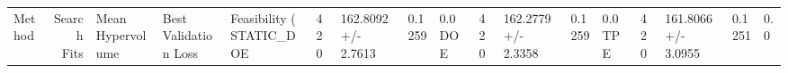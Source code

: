 \begin{tabular}{lrlll}
\toprule
Method & Search Fits & Mean Hypervolume & Best Validation Loss & Feasibility (%
\midrule
STATIC_DOE & 420 & 162.8092 +/- 2.7613 & 0.1259 & 0.0%
DOE & 420 & 162.2779 +/- 2.3358 & 0.1259 & 0.0%
TPE & 420 & 161.8066 +/- 3.0955 & 0.1251 & 0.0%
\bottomrule
\end{tabular}
